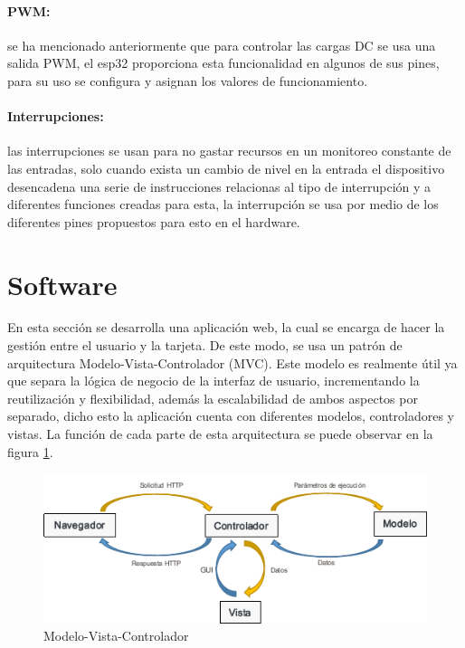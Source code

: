 \paragraph{PWM:}

se ha mencionado anteriormente que para controlar las cargas DC se usa una salida PWM, el esp32 proporciona esta funcionalidad en algunos de sus pines, para su uso se configura y asignan los valores de funcionamiento.

\paragraph{Interrupciones:}

las interrupciones se usan para no gastar recursos en un monitoreo constante de las entradas, solo cuando exista un cambio de nivel en la entrada el dispositivo desencadena una serie de instrucciones relacionas al tipo de interrupción y a diferentes funciones creadas para esta, la interrupción se usa por medio de los diferentes pines propuestos para esto en el hardware.

\section{Software}

En esta sección se desarrolla una aplicación web, la cual se encarga de hacer la gestión entre el usuario y la tarjeta. De este modo, se usa un patrón de arquitectura Modelo-Vista-Controlador (MVC). Este modelo es realmente útil ya que separa la lógica de negocio de la interfaz de usuario, incrementando la reutilización y flexibilidad, además la escalabilidad de ambos aspectos por separado, dicho esto la aplicación cuenta con diferentes modelos, controladores y vistas. La función de cada parte de esta arquitectura se puede observar en la figura \ref{fig:mvc}.\\


\begin{figure}[H]
	\centering
	\caption{Modelo-Vista-Controlador}
	\label{fig:mvc}
	\includegraphics[width=0.7\linewidth]{Imagenes/MVC}
\end{figure}


